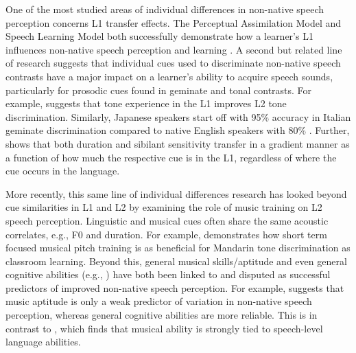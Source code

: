 \documentclass[a4paper]{article}
\begin{document}
One of the most studied areas of individual differences in non-native speech perception concerns L1 transfer effects. The Perceptual Assimilation Model and Speech Learning Model both successfully demonstrate how a learner’s L1 influences non-native speech perception and learning \cite{Flege_95,Best_1995}. A second but related line of research suggests that individual cues used to discriminate non-native speech contrasts have a major impact on a learner's ability to acquire speech sounds, particularly for prosodic cues found in geminate and tonal contrasts. For example, \cite{Francis_2008} suggests that tone experience in the L1 improves L2 tone discrimination.
Similarly, Japanese speakers start off with 95\% accuracy in Italian geminate discrimination compared to native English speakers with 80\% \cite{Tsukada_Cox_Hajek_Hirata_2017}. Further, \cite{Pajak_2014} shows that both duration and sibilant sensitivity transfer in a gradient manner as a function of how much the respective cue is in the L1, regardless of where the cue occurs in the language. 

More recently, this same line of individual differences research has looked beyond cue similarities in L1 and L2 by examining the role of music training on L2 speech perception. Linguistic and musical cues often share the same acoustic correlates, e.g., F0 and duration. For example, \cite{Wiener_Bradley_2020} demonstrates how short term focused musical pitch training is as beneficial for Mandarin tone discrimination as classroom learning. Beyond this, general musical skills/aptitude and even general cognitive abilities (e.g., \cite{Zheng_2021}) have both been linked to and disputed as successful predictors of improved non-native speech perception. For example, \cite{Zheng_2021} suggests that music aptitude is only a weak predictor of variation in non-native speech perception, whereas general cognitive abilities are more reliable. This is in contrast to \cite{Slevc_2006}, which finds that musical ability is strongly tied to speech-level language abilities. 
\end{document}
